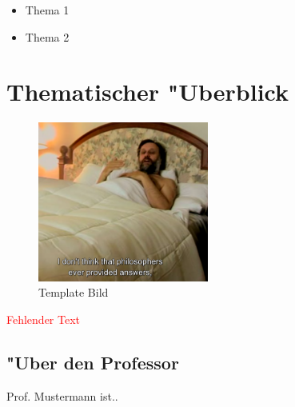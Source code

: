 \documentclass[]{scrartcl}
\begin{document}
\begin{itemize}
    \item Thema 1
    \item Thema 2
  \end{itemize}
\newpage
\section{Thematischer "Uberblick}


\begin{figure}[h]
	\centering
	\includegraphics[width=0.5\textwidth]{images/template.png}
	\caption{Template Bild}
	\label{fig:template}
\end{figure}


\textcolor{red}{Fehlender Text}


\newpage
\subsection{"Uber den Professor}
Prof. Mustermann ist..
\end{document}
